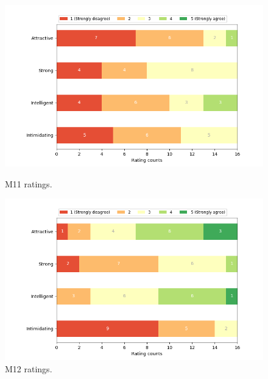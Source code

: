 \begin{figure}[H]
  \includegraphics[width=\linewidth]{Survey/MRatings/avatar_m11.png}
  \caption{M11 ratings.}
\endminipage\hfill
{}
  \includegraphics[width=\linewidth]{Survey/MRatings/avatar_m12.png}
  \caption{M12 ratings.}
\endminipage\hfill
\end{figure}
